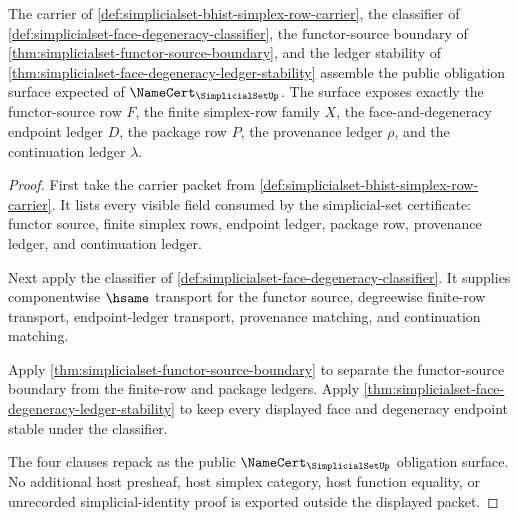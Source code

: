 \begin{theorem}
\label{thm:simplicialset-namecert-obligation-surface}
The carrier of \autoref{def:simplicialset-bhist-simplex-row-carrier}, the classifier of \autoref{def:simplicialset-face-degeneracy-classifier}, the functor-source boundary of \autoref{thm:simplicialset-functor-source-boundary}, and the ledger stability of \autoref{thm:simplicialset-face-degeneracy-ledger-stability} assemble the public obligation surface expected of $\NameCert_{\SimplicialSetUp}$. The surface exposes exactly the functor-source row $F$, the finite simplex-row family $X$, the face-and-degeneracy endpoint ledger $D$, the package row $P$, the provenance ledger $\rho$, and the continuation ledger $\lambda$.
\end{theorem}
\begin{proof}
First take the carrier packet from \autoref{def:simplicialset-bhist-simplex-row-carrier}. It lists every visible field consumed by the simplicial-set certificate: functor source, finite simplex rows, endpoint ledger, package row, provenance ledger, and continuation ledger.

Next apply the classifier of \autoref{def:simplicialset-face-degeneracy-classifier}. It supplies componentwise $\hsame$ transport for the functor source, degreewise finite-row transport, endpoint-ledger transport, provenance matching, and continuation matching.

Apply \autoref{thm:simplicialset-functor-source-boundary} to separate the functor-source boundary from the finite-row and package ledgers. Apply \autoref{thm:simplicialset-face-degeneracy-ledger-stability} to keep every displayed face and degeneracy endpoint stable under the classifier.

The four clauses repack as the public $\NameCert_{\SimplicialSetUp}$ obligation surface. No additional host presheaf, host simplex category, host function equality, or unrecorded simplicial-identity proof is exported outside the displayed packet.
\end{proof}

